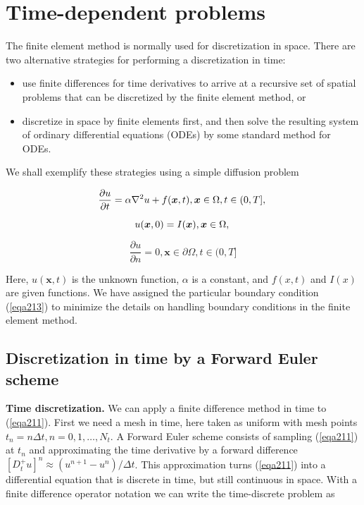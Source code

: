 \documentclass[../main.tex]{subfiles}
\begin{document}
	\chapter{Time-dependent problems}
\label{chap:chap_19}
	\noindent The finite element method is normally used for discretization in space. There are two alternative strategies for performing a discretization in time:
	
	\begin{itemize}
		\item use finite differences for time derivatives to arrive at a recursive set of spatial problems that can be discretized by the finite element method, or
		\item discretize in space by finite elements first, and then solve the resulting system of ordinary differential equations (ODEs) by some standard method for ODEs.
	\end{itemize}
	 
	\noindent We shall exemplify these strategies using a simple diffusion problem
	
	\begin{equation}
	\label{eqa211}
		\frac{\partial u}{\partial t}=\alpha \nabla^{2} u+f(\boldsymbol{x}, t),\boldsymbol{x} \in \Omega, t \in(0, T], \\
	\end{equation}

	\begin{equation}
	\label{eqa212}
		u(\boldsymbol{x}, 0)=I(\boldsymbol{x}), \boldsymbol{x} \in \Omega, \\
	\end{equation}

	\begin{equation}
	\label{eqa213}
		\frac{\partial u}{\partial n}=0,\boldsymbol{x} \in \partial \Omega, t \in(0, T]
	\end{equation}

	\noindent Here, $u(\boldsymbol{x}, t)$ is the unknown function, $\alpha$ is a constant, and $f(x, t)$ and $I(x)$ are given functions. We have assigned the particular boundary condition (\ref{eqa213}) to minimize the details on handling boundary conditions in the finite element method.

\section[Discretization in time by a Forward Euler scheme]{Discretization in time by a Forward Euler scheme}
	\label{sec:sec_19_1}
	\noindent \textbf{Time discretization.   } We can apply a finite difference method in time to (\ref{eqa211}). First we need a mesh in time, here taken as uniform with mesh points $t_{n}=n \Delta t, n=0,1, \ldots, N_{t}$. A Forward Euler scheme consists of sampling (\ref{eqa211}) at $t_{n}$ and approximating the time derivative by a forward difference $\left[D_{t}^{+} u\right]^{n} \approx\left(u^{n+1}-u^{n}\right) / \Delta t$. This approximation turns (\ref{eqa211}) into a differential equation that is discrete in time, but still continuous in space. With a finite difference operator notation we can write the time-discrete problem as
\end{document}

